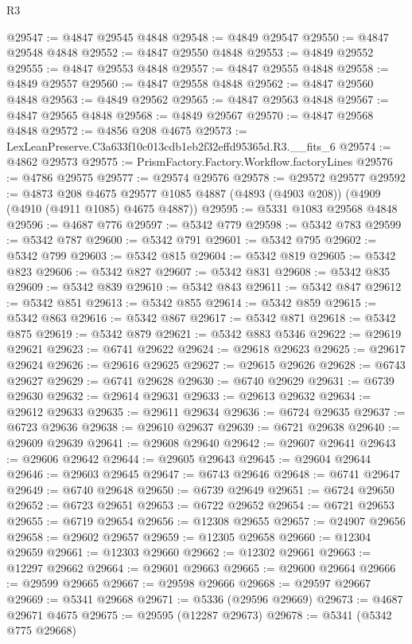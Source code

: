 \begin{lexlean}{R3}
\begin{coremodule}
@29547 := @4847 @29545 @4848
@29548 := @4849 @29547
@29550 := @4847 @29548 @4848
@29552 := @4847 @29550 @4848
@29553 := @4849 @29552
@29555 := @4847 @29553 @4848
@29557 := @4847 @29555 @4848
@29558 := @4849 @29557
@29560 := @4847 @29558 @4848
@29562 := @4847 @29560 @4848
@29563 := @4849 @29562
@29565 := @4847 @29563 @4848
@29567 := @4847 @29565 @4848
@29568 := @4849 @29567
@29570 := @4847 @29568 @4848
@29572 := @4856 @208 @4675
@29573 := LexLeanPreserve.C3a633f10c013cdb1eb2f32effd95365d.R3.__fits_6
@29574 := @4862 @29573
@29575 := PrismFactory.Factory.Workflow.factoryLines
@29576 := @4786 @29575
@29577 := @29574 @29576
@29578 := @29572 @29577
@29592 := @4873
    @208
    @4675
    @29577
    @1085
    @4887
    (@4893 (@4903 @208))
    (@4909 (@4910 (@4911 @1085) @4675 @4887))
@29595 := @5331 @1083 @29568 @4848
@29596 := @4687 @776
@29597 := @5342 @779
@29598 := @5342 @783
@29599 := @5342 @787
@29600 := @5342 @791
@29601 := @5342 @795
@29602 := @5342 @799
@29603 := @5342 @815
@29604 := @5342 @819
@29605 := @5342 @823
@29606 := @5342 @827
@29607 := @5342 @831
@29608 := @5342 @835
@29609 := @5342 @839
@29610 := @5342 @843
@29611 := @5342 @847
@29612 := @5342 @851
@29613 := @5342 @855
@29614 := @5342 @859
@29615 := @5342 @863
@29616 := @5342 @867
@29617 := @5342 @871
@29618 := @5342 @875
@29619 := @5342 @879
@29621 := @5342 @883 @5346
@29622 := @29619 @29621
@29623 := @6741 @29622
@29624 := @29618 @29623
@29625 := @29617 @29624
@29626 := @29616 @29625
@29627 := @29615 @29626
@29628 := @6743 @29627
@29629 := @6741 @29628
@29630 := @6740 @29629
@29631 := @6739 @29630
@29632 := @29614 @29631
@29633 := @29613 @29632
@29634 := @29612 @29633
@29635 := @29611 @29634
@29636 := @6724 @29635
@29637 := @6723 @29636
@29638 := @29610 @29637
@29639 := @6721 @29638
@29640 := @29609 @29639
@29641 := @29608 @29640
@29642 := @29607 @29641
@29643 := @29606 @29642
@29644 := @29605 @29643
@29645 := @29604 @29644
@29646 := @29603 @29645
@29647 := @6743 @29646
@29648 := @6741 @29647
@29649 := @6740 @29648
@29650 := @6739 @29649
@29651 := @6724 @29650
@29652 := @6723 @29651
@29653 := @6722 @29652
@29654 := @6721 @29653
@29655 := @6719 @29654
@29656 := @12308 @29655
@29657 := @24907 @29656
@29658 := @29602 @29657
@29659 := @12305 @29658
@29660 := @12304 @29659
@29661 := @12303 @29660
@29662 := @12302 @29661
@29663 := @12297 @29662
@29664 := @29601 @29663
@29665 := @29600 @29664
@29666 := @29599 @29665
@29667 := @29598 @29666
@29668 := @29597 @29667
@29669 := @5341 @29668
@29671 := @5336 (@29596 @29669)
@29673 := @4687 @29671 @4675
@29675 := @29595 (@12287 @29673)
@29678 := @5341 (@5342 @775 @29668)

\end{coremodule}
\end{lexlean}
